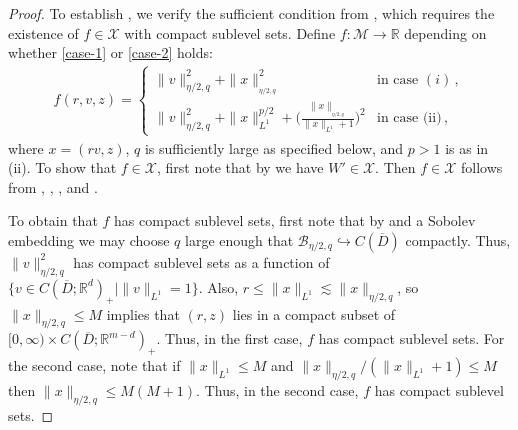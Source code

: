 \documentclass[final]{amsart}
\numberwithin{thm}{section}
\numberwithin{equation}{section}
\newcommand{\mcM}{\mathcal{M}}
\newcommand{\R}{\mathbb{R}}
\newcommand{\B}{\mathcal{B}}
\newcommand{\X}{\mathcal{X}}
\begin{document}
\begin{proof}
To establish , we verify the sufficient condition 
from , which requires the existence of 
$f \in \X$ with compact sublevel sets. 
Define $f : \mcM \to \R$ depending on whether \ref{case-1} or \ref{case-2} holds:
\begin{align*}
    f(r, v, z) = \begin{cases}
        \|v\|_{\eta/2,q}^2 + \|x\|_{_{\eta/2,q}}^2 & \text{in case }(i)\,, \\
        \|v\|_{\eta/2,q}^2 + \|x\|_{L^1}^{p/2} +\Big(\frac{\|x\|_{_{\eta/2,q}}}{\|x\|_{L^1} + 1}\Big)^2 & \text{in case (ii)} \,,
    \end{cases}
\end{align*}
where $x = (rv, z)$, $q$ is sufficiently large as specified below, and $p > 1$ is as in (ii). To show that $f \in \X$, first note that by  we have $W' \in \X$. Then $f \in \X$ follows from , , , and .

To obtain that $f$ has compact sublevel sets, first note that by  and a Sobolev embedding we may choose $q$ large enough that $\B_{\eta/2,q} \hookrightarrow C(\overline D)$ compactly. Thus, $\|v\|_{\eta/2,q}^2$ has compact sublevel sets as a function of $\{v \in C(\overline D;\R^d)_+ \mid \|v\|_{L^1} = 1\}$. Also, $r \leq \|x\|_{L^1} \lesssim \|x\|_{\eta/2,q}$, so $\|x\|_{\eta/2,q} \leq M$ implies that $(r,z)$ lies in a compact subset of $[0,\infty) \times C(\overline D;\R^{m-d})_+$. Thus, in the first case, $f$ has compact sublevel sets. For the second case, note that if $\|x\|_{L^1} \leq M$ and $\|x\|_{\eta/2,q}/(\|x\|_{L^1} + 1) \leq M$ then $\|x\|_{\eta/2,q} \leq M(M+1)$. Thus, in the second case, $f$ has compact sublevel sets.







    
\end{proof}
\end{document}
